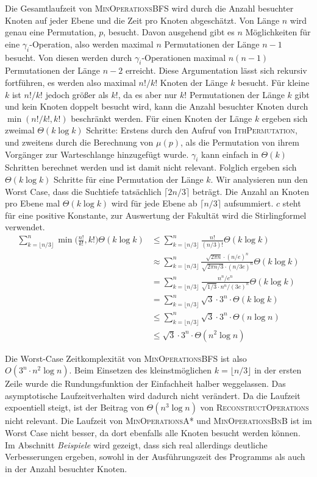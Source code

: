 \documentclass[a4paper, 11pt, ngerman]{article}
\begin{document}
Die Gesamtlaufzeit von \textsc{MinOperationsBFS} wird durch die Anzahl besuchter Knoten auf jeder Ebene und die Zeit pro Knoten abgeschätzt. Von Länge $n$ wird genau eine Permutation, $p$, besucht. Davon ausgehend gibt es $n$ Möglichkeiten für eine $\gamma_i$-Operation, also werden maximal $n$ Permutationen der Länge $n - 1$ besucht. Von diesen werden durch $\gamma_i$-Operationen maximal $n(n-1)$ Permutationen der Länge $n - 2$ erreicht. Diese Argumentation lässt sich rekursiv fortführen, es werden also maximal $n! / k!$ Knoten der Länge $k$ besucht. Für kleine $k$ ist $n! / k!$ jedoch größer als $k!$, da es aber nur $k!$ Permutationen der Länge $k$ gibt und kein Knoten doppelt besucht wird, kann die Anzahl besuchter Knoten durch $\min(n! / k!, k!)$ beschränkt werden. Für einen Knoten der Länge $k$ ergeben sich zweimal $\Theta(k \log k)$ Schritte: Erstens durch den Aufruf von \textsc{IthPermutation}, und zweitens durch die Berechnung von $\mu(p)$, als die Permutation von ihrem Vorgänger zur Warteschlange hinzugefügt wurde. $\gamma_i$ kann einfach in $\Theta(k)$ Schritten berechnet werden und ist damit nicht relevant. Folglich ergeben sich $\Theta(k \log k)$ Schritte für eine Permutation der Länge $k$. Wir analysieren nun den Worst Case, dass die Suchtiefe tatsächlich $\lceil 2n / 3 \rceil$ beträgt. Die Anzahl an Knoten pro Ebene mal $\Theta(k \log k)$ wird für jede Ebene ab $\lceil n/ 3 \rceil$ aufsummiert. $c$ steht für eine positive Konstante, zur Auswertung der Fakultät wird die Stirlingformel verwendet.
\begin{align*}
    \sum_{k = \lfloor n/3 \rfloor}^n \min \bigg ( \frac {n!}{k!}, k! \bigg ) \Theta(k \log k) & \le \sum_{k = \lfloor n/3 \rfloor}^n  \frac {n!} {(n/3)!} \Theta(k \log k)
    \\ & \approx  \sum_{k = \lfloor n/3 \rfloor}^n
    \frac {\sqrt{2 \pi n} \cdot (n/e)^n} {\sqrt{2 \pi n/3} \cdot (n/3e)^n} \Theta(k \log k)
    \\ & =  \sum_{k = \lfloor n/3 \rfloor}^n
    \frac {n^n / e^n} {\sqrt{1/3} \cdot n^n / (3e)^n} \Theta (k \log k)
    \\ & =  \sum_{k = \lfloor n/3 \rfloor}^n
    \sqrt 3 \cdot 3^n \cdot \Theta(k \log k)
    \\ & \le  \sum_{k = \lfloor n/3 \rfloor}^n
    \sqrt 3 \cdot 3^n \cdot \Theta (n \log n)
    \\ & \le
    \sqrt 3 \cdot 3^n \cdot \Theta(n^2 \log n)
\end{align*}

Die Worst-Case Zeitkomplexität von \textsc{MinOperationsBFS} ist also $O(3^n \cdot n^2 \log n)$. Beim Einsetzen des kleinstmöglichen $k = \lfloor n/3 \rfloor$ in der ersten Zeile wurde die Rundungsfunktion der Einfachheit halber weggelassen. Das asymptotische Laufzeitverhalten wird dadurch nicht verändert. Da die Laufzeit expoentiell steigt, ist der Beitrag von $\Theta(n^3 \log n)$ von \textsc{ReconstructOperations} nicht relevant. Die Laufzeit von \textsc{MinOperationsA*} und \textsc{MinOperationsBnB} ist im Worst Case nicht besser, da dort ebenfalls alle Knoten besucht werden können. Im Abschnitt \emph{Beispiele} wird gezeigt, dass sich real allerdings deutliche Verbesserungen ergeben, sowohl in der Ausführungszeit des Programms als auch in der Anzahl besuchter Knoten.
\end{document}

